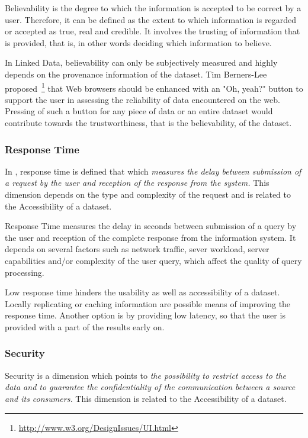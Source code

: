 
\begin{definition}[Believability]
Believability is the degree to which the information is accepted to be correct by a user.
Therefore, it can be defined as the extent to which information is regarded or accepted as true, real and credible.
It involves the trusting of information that is provided, that is, in other words deciding which information to believe.
\end{definition}

In Linked Data, believability can only be subjectively measured and highly depends on the provenance information of the dataset. 
Tim Berners-Lee proposed~\footnote{\url{http://www.w3.org/DesignIssues/UI.html}} that Web browsers should be enhanced with an "Oh, yeah?" button to support the user in assessing the reliability of data encountered on the web. 
Pressing of such a button for any piece of data or an entire dataset would contribute towards the trustworthiness, that is the believability, of the dataset. 

\subsubsection{Response Time}
In \cite{Bizerthesis}, response time is defined that which \emph{measures the delay between submission of a request by the user and reception of the response from the system.}
This dimension depends on the type and complexity of the request and is related to the Accessibility of a dataset.

\begin{definition}
Response Time measures the delay in seconds between submission of a query by the user and reception of the complete response from the information system.
It depends on several factors such as network traffic, sever workload, server capabilities and/or complexity of the user query, which affect the quality of query processing.
\end{definition}

Low response time hinders the usability as well as accessibility of a dataset.
Locally replicating or caching information are possible means of improving the response time.
Another option is by providing low latency, so that the user is provided with a part of the results early on.

\subsubsection{Security}
Security is a dimension which points to \emph{the possibility to restrict access to the data and to guarantee the confidentiality of the communication between a source and its consumers.} 
This dimension is related to the Accessibility of a dataset.

